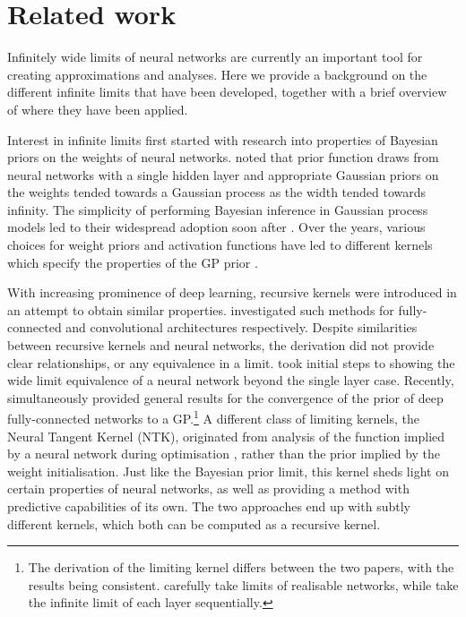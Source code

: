 \documentclass{article}
\begin{document}
\section{Related work}
Infinitely wide limits of neural networks are currently an important tool for creating approximations and analyses. Here we provide a background on the different infinite limits that have been developed, together with a brief overview of where they have been applied.

Interest in infinite limits first started with research into properties of Bayesian priors on the weights of neural networks. \citet{neal1996bayesian} noted that prior function draws from neural networks with a single hidden layer and appropriate Gaussian priors on the weights tended towards a Gaussian process as the width tended towards infinity. The simplicity of performing Bayesian inference in Gaussian process models led to their widespread adoption soon after \citep{williams1996gpr,gpml}. Over the years, various choices for weight priors and activation functions have led to different kernels which specify the properties of the GP prior \citep{williams1997inf,cho2009mkm}.

With increasing prominence of deep learning, recursive kernels were introduced in an attempt to obtain similar properties. \citet{cho2009mkm,mairal2014ckn} investigated such methods for fully-connected and convolutional architectures respectively. Despite similarities between recursive kernels and neural networks, the derivation did not provide clear relationships, or any equivalence in a limit. \citet{hazan2015} took initial steps to showing the wide limit equivalence of a neural network beyond the single layer case. Recently, \citet{matthews2018dnnlimit,lee2018dnnlimit} simultaneously provided general results for the convergence of the prior of deep fully-connected networks to a GP.\footnote{The derivation of the limiting kernel differs between the two papers, with the results being consistent. \citet{matthews2018dnnlimit} carefully take limits of realisable networks, while \citet{lee2018dnnlimit} take the infinite limit of each layer sequentially.%
} 
A different class of limiting kernels, the Neural Tangent Kernel (NTK), originated from analysis of the function implied by a neural network during optimisation \citep{jacot2018ntk}, rather than the prior implied by the weight initialisation. Just like the Bayesian prior limit, this kernel sheds light on certain properties of neural networks, as well as providing a method with predictive capabilities of its own. 
The two approaches end up with subtly different kernels, which both can be computed as a recursive kernel.
\end{document}
